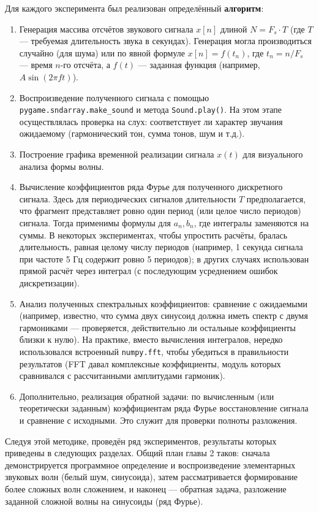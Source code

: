 \documentclass[bachelor, och, diploma]{SCWorks}
\begin{document}
Для каждого эксперимента был реализован определённый \textbf{алгоритм}:
\begin{enumerate}
    \item Генерация массива отсчётов звукового сигнала $x[n]$ длиной $N = F_s \cdot T$ (где $T$ --- требуемая длительность звука в секундах). Генерация могла производиться случайно (для шума) или по явной формуле $x[n] = f(t_n)$, где $t_n = n/F_s$ --- время $n$-го отсчёта, а $f(t)$ --- заданная функция (например, $A\sin(2\pi f t)$).
    \item Воспроизведение полученного сигнала с помощью \texttt{pygame.sndarray.make\_sound} и метода \texttt{Sound.play()}. На этом этапе осуществлялась проверка на слух: соответствует ли характер звучания ожидаемому (гармонический тон, сумма тонов, шум и т.д.).
    \item Построение графика временной реализации сигнала $x(t)$ для визуального анализа формы волны.
    \item Вычисление коэффициентов ряда Фурье для полученного дискретного сигнала. Здесь для периодических сигналов длительности $T$ предполагается, что фрагмент представляет ровно один период (или целое число периодов) сигнала. Тогда применимы формулы для $a_n, b_n$, где интегралы заменяются на суммы. В некоторых экспериментах, чтобы упростить расчёты, бралась длительность, равная целому числу периодов (например, 1 секунда сигнала при частоте 5 Гц содержит ровно 5 периодов); в других случаях использован прямой расчёт через интеграл (с последующим усреднением ошибок дискретизации).
    \item Анализ полученных спектральных коэффициентов: сравнение с ожидаемыми (например, известно, что сумма двух синусоид должна иметь спектр с двумя гармониками --- проверяется, действительно ли остальные коэффициенты близки к нулю). На практике, вместо вычисления интегралов, нередко использовался встроенный \texttt{numpy.fft}, чтобы убедиться в правильности результатов (FFT давал комплексные коэффициенты, модуль которых сравнивался с рассчитанными амплитудами гармоник).
    \item Дополнительно, реализация обратной задачи: по вычисленным (или теоретически заданным) коэффициентам ряда Фурье восстановление сигнала и сравнение с исходными. Это служит для проверки полноты разложения.
\end{enumerate}

Следуя этой методике, проведён ряд экспериментов, результаты которых приведены в следующих разделах. Общий план главы 2 таков: сначала демонстрируется программное определение и воспроизведение элементарных звуковых волн (белый шум, синусоида), затем рассматривается формирование более сложных волн сложением, и наконец --- обратная задача, разложение заданной сложной волны на синусоиды (ряд Фурье). 
\end{document}
